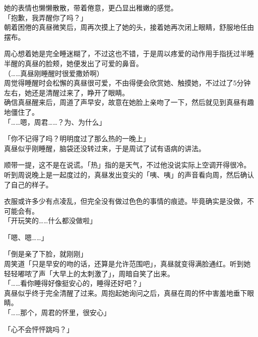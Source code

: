 她的表情也懒懒散散，带着倦意，更凸显出稚嫩的感觉。\\

「抱歉，我弄醒你了吗？」\\

朝着困倦的真昼微笑后，周再次摸上了她的头，接着她再次闭上眼睛，舒服地任由摆布。

周心想着她是完全睡迷糊了，不过这也不错，于是周以疼爱的动作用手指抚过半睡半醒的真昼的脸颊，她便发出了可爱的鼻音。\\

（……真昼刚睡醒时很爱撒娇啊）\\

周觉得睡醒时会松懈的真昼很可爱，不由得便会欣赏她、触摸她，不过过了5分钟左右，她还是清醒过来了，睁开了眼睛。\\

确信真昼醒来后，周道了声早安，故意在她脸上亲吻了一下，然后就见到真昼有趣地僵住了。\\

「……嗯，周君……？为、为什么」

「你不记得了吗？明明度过了那么热的一晚上」\\

真昼似乎刚睡醒，脑袋还没转过来，于是周试了试有语病的讲法。

顺带一提，这不是在说谎。「热」指的是天气，不过他没说实际上空调开得很冷。\\

听到周说晚上是一起度过的，真昼发出变尖的「咦、咦」的声音看向周，然后确认了自己的样子。

衣服或许多少有点凌乱，但完全没有做过色色的事情的痕迹。毕竟确实是没做，不可能会有。\\

「开玩笑的……什么都没做啦」

「嗯、嗯……」

「倒是亲了下脸，就刚刚」\\

周笑道「只是早安的吻的话，还算是允许范围吧」，真昼就变得满脸通红。听到她轻轻嘟哝了声「大早上的太刺激了」，周暗自笑了出来。\\

「……看你睡得好像挺安心的，睡得还好吧？」\\

真昼似乎终于完全清醒了过来。周抱起她询问之后，真昼在周的怀中害羞地垂下眼睛。\\

「……那个，周君的怀里，很安心」

「心不会怦怦跳吗？」

